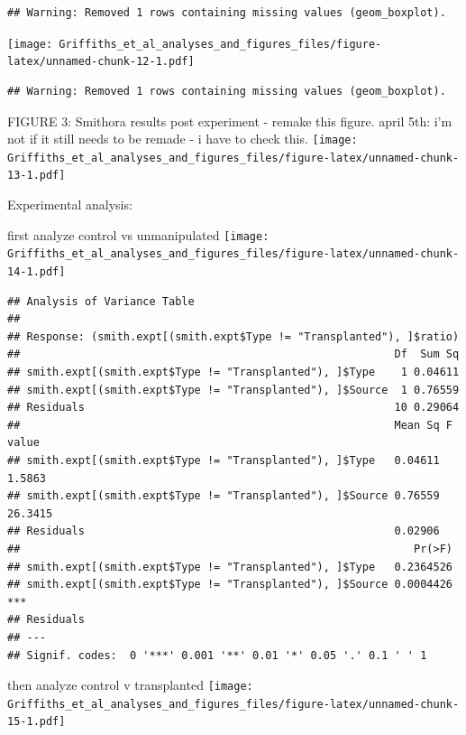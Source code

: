 \documentclass[]{article}
\begin{document}
\begin{verbatim}
## Warning: Removed 1 rows containing missing values (geom_boxplot).
\end{verbatim}

\texttt{[image: Griffiths\_et\_al\_analyses\_and\_figures\_files/figure-latex/unnamed-chunk-12-1.pdf]}

\begin{verbatim}
## Warning: Removed 1 rows containing missing values (geom_boxplot).
\end{verbatim}

FIGURE 3: Smithora results post experiment - remake this figure. april
5th: i'm not if it still needs to be remade - i have to check this.
\texttt{[image: Griffiths\_et\_al\_analyses\_and\_figures\_files/figure-latex/unnamed-chunk-13-1.pdf]}

Experimental analysis:

first analyze control vs unmanipulated
\texttt{[image: Griffiths\_et\_al\_analyses\_and\_figures\_files/figure-latex/unnamed-chunk-14-1.pdf]}

\begin{verbatim}
## Analysis of Variance Table
## 
## Response: (smith.expt[(smith.expt$Type != "Transplanted"), ]$ratio)
##                                                          Df  Sum Sq
## smith.expt[(smith.expt$Type != "Transplanted"), ]$Type    1 0.04611
## smith.expt[(smith.expt$Type != "Transplanted"), ]$Source  1 0.76559
## Residuals                                                10 0.29064
##                                                          Mean Sq F value
## smith.expt[(smith.expt$Type != "Transplanted"), ]$Type   0.04611  1.5863
## smith.expt[(smith.expt$Type != "Transplanted"), ]$Source 0.76559 26.3415
## Residuals                                                0.02906        
##                                                             Pr(>F)    
## smith.expt[(smith.expt$Type != "Transplanted"), ]$Type   0.2364526    
## smith.expt[(smith.expt$Type != "Transplanted"), ]$Source 0.0004426 ***
## Residuals                                                             
## ---
## Signif. codes:  0 '***' 0.001 '**' 0.01 '*' 0.05 '.' 0.1 ' ' 1
\end{verbatim}

then analyze control v transplanted
\texttt{[image: Griffiths\_et\_al\_analyses\_and\_figures\_files/figure-latex/unnamed-chunk-15-1.pdf]}
\end{document}
